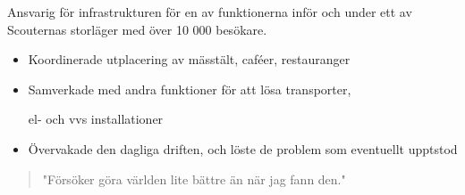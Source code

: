 \documentclass[10pt,a4paper,ragged2e,withhyper]{altacv}
\begin{document}
\begin{paracol}{2}
\divider

Ansvarig för infrastrukturen för en av funktionerna inför och under ett av Scouternas storläger med över 10 000 besökare.\smallskip
\begin{itemize}
\item Koordinerade utplacering av mässtält, caféer, restauranger
\item Samverkade med andra funktioner för att lösa transporter, 

el- och vvs installationer
\item Övervakade den dagliga driften, och löste de problem som eventuellt upptstod
\end{itemize}
\switchcolumn


\begin{quote}
"Försöker göra världen lite bättre än när jag fann den."
\end{quote}








\\
\\
\\
\\
\divider\smallskip

\\
\\



\end{paracol}
\end{document}
